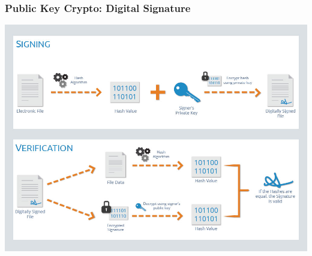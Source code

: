 \begin{frame}
\begin{columns}
\begin{column}{0.65\textwidth}
\begin{center}
            \end{center}
        \end{column}
    \end{columns}
\end{frame}

\begin{frame}
    \frametitle{Public Key Crypto: Digital Signature}
    \includegraphics[scale=0.3]{./figures/digital-signatures-methodology.jpg}
\end{frame}

